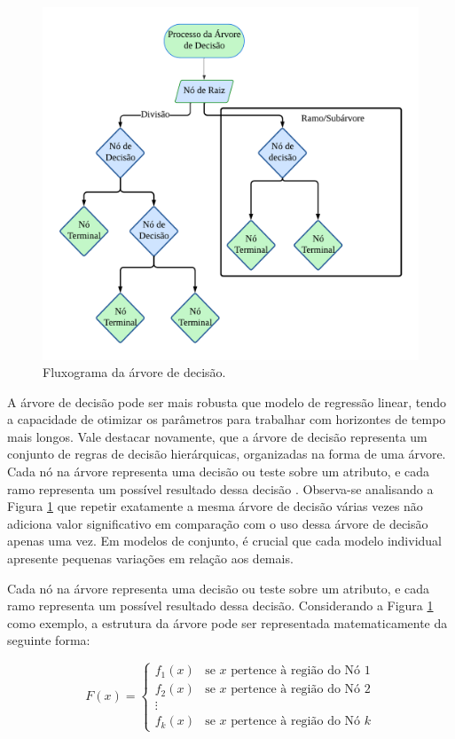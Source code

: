  \begin{figure}[H]
 	\centering
 	\caption{Fluxograma da árvore de decisão.}
 	\label{fig:decison}
 	\includegraphics[width=0.7\linewidth]{Modelos/Figuras/decison.pdf}
 	
 \end{figure}
  
 A árvore de decisão pode ser mais robusta que modelo de regressão linear, tendo a capacidade de otimizar os parâmetros para trabalhar com horizontes de tempo mais longos. Vale destacar novamente, que a árvore de decisão representa um conjunto de regras de decisão hierárquicas, organizadas na forma de uma árvore. Cada nó na árvore representa uma decisão ou teste sobre um atributo, e cada ramo representa um possível resultado dessa decisão \cite{GIFFORD2023100296}. Observa-se analisando a Figura \ref{fig:decison} que repetir exatamente a mesma árvore de decisão várias vezes não adiciona valor significativo em comparação com o uso dessa árvore de decisão apenas uma vez. Em modelos de conjunto, é crucial que cada modelo individual apresente pequenas variações em relação aos demais.
 

Cada nó na árvore representa uma decisão ou teste sobre um atributo, e cada ramo representa um possível resultado dessa decisão. Considerando a Figura \ref{fig:decison} como exemplo, a estrutura da árvore pode ser representada matematicamente da seguinte forma:
 
 $$ F(x) = \begin{cases} 
 	f_1(x) & \text{se } x \text{ pertence à região do Nó 1} \\
 	f_2(x) & \text{se } x \text{ pertence à região do Nó 2} \\
 	\vdots \\
 	f_k(x) & \text{se } x \text{ pertence à região do Nó } k 
 \end{cases} $$
 
